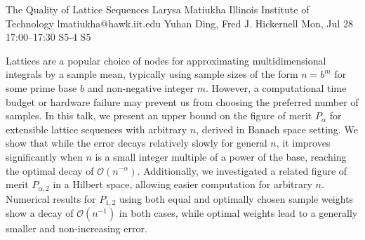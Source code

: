 \begin{talk}
  {The Quality of Lattice Sequences}%
  {Larysa Matiukha}%
  {Illinois Institute of Technology}%
  {lmatiukha@hawk.iit.edu}%
  {Yuhan Ding, Fred J. Hickernell}%
  {}%
  {Mon, Jul 28 17:00–17:30}%
  {S5-4}%
  {S5}%
  
				

Lattices are a popular choice of nodes for approximating multidimensional integrals by a sample mean, typically using sample sizes of the form $n = b^m$ for some prime base $b$ and non-negative integer $m$. However, a computational time budget or hardware failure may prevent us from choosing the preferred number of samples. In this talk, we present an upper bound on the figure of merit $P_\alpha$ for extensible lattice sequences with arbitrary $n$, derived in Banach space setting. We show that while the error decays relatively slowly for general $n$, it improves significantly when $n$ is a small integer multiple of a power of the base, reaching the optimal decay of $\mathcal{O}(n^{-\alpha})$. %
Additionally, we investigated a related figure of merit $P_{\alpha,2}$ in a Hilbert space, allowing easier computation for arbitrary $n$. Numerical results for $P_{1,2}$ using both equal and optimally chosen sample weights show a decay of $\mathcal{O}(n^{-1})$ in both cases, while optimal weights lead to a generally smaller and non-increasing error. 





\end{talk}

